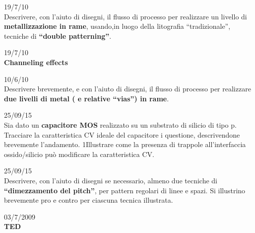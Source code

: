 19/7/10\\

Descrivere, con l’aiuto di disegni, il flusso di processo per realizzare un livello di {\bf metallizzazione in rame},
usando,in luogo della litografia “tradizionale”, tecniche di {\bf  “double patterning”}.

\vspace{3mm}

19/7/10\\

{\bf Channeling effects}

\vspace{3mm}

10/6/10\\

Descrivere brevemente, e con l’aiuto di disegni, il flusso di processo per realizzare {\bf due livelli di
metal ( e relative “vias”) in rame}.

\vspace{3mm}

25/09/15\\

Sia dato un {\bf capacitore MOS} realizzato su un substrato di silicio di tipo p.
Tracciare la caratteristica CV ideale del capacitore i questione, descrivendone
brevemente l’andamento.
1Illustrare come la presenza di trappole all’interfaccia ossido/silicio può modificare la
caratteristica CV.

\vspace{3mm}

25/09/15\\

Descrivere, con l’aiuto di disegni se necessario, almeno due tecniche di {\bf “dimezzamento
del pitch”}, per pattern regolari di linee e spazi. Si illustrino brevemente pro e contro per
ciascuna tecnica illustrata.

\vspace{3mm}

03/7/2009\\

{\bf TED}


